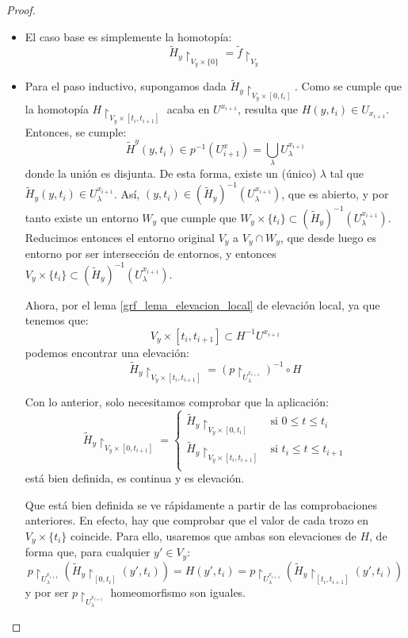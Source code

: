 \begin{lem}
\begin{proof}
		\begin{itemize}
			\item El caso base es simplemente la homotopía:
			\[\widetilde{H}_y\restriction_{V_y\times\{0\}}=\widetilde{f}\restriction_{V_y}\]
			
			\item Para el paso inductivo, supongamos dada $\widetilde{H}_y\restriction_{V_y\times [0,t_i]}$. Como se cumple que la homotopía $H\restriction_{V_y\times [t_i,t_{i+1}]}$ acaba en $U^{x_{i+1}}$, resulta que $H(y,t_i)\in U_{x_{i+1}}$. Entonces, se cumple:
			\[\widetilde{H}^y(y, t_i)\in p^{-1}(U^x_{i+1})=\bigcup_\lambda U_\lambda^{x_{i+1}}\]
			donde la unión es disjunta. De esta forma, existe un (único) $\lambda$ tal que $\widetilde{H}_y(y, t_i)\in U_\lambda^{x_{i+1}}$. Así, $(y,t_i)\in (\widetilde{H}_y)^{-1}(U_\lambda^{x_{i+1}})$, que es abierto, y por tanto existe un entorno $W_y$ que cumple que $W_y\times \{t_i\}\subset (\widetilde{H}_y)^{-1}(U_\lambda^{x_{i+1}})$. Reducimos entonces el entorno original $V_y$ a $V_y\cap W_y$, que desde luego es entorno por ser intersección de entornos, y entonces $V_y\times\{t_i\}\subset (\widetilde{H}_y)^{-1}(U_\lambda^{x_{i+1}})$.
			
			Ahora, por el lema \ref{grf_lema_elevacion_local} de elevación local, ya que tenemos que:
			\[V_y\times [t_i, t_{i+1}]\subset H^{-1} U^{x_{i+1}}\]
			podemos encontrar una elevación:
			\[\widetilde{H}_y\restriction_{V_y\times [t_i,t_{i+1}]} = (p\restriction_{U_\lambda^{x_{i+1}}})^{-1}\circ H \]
			
			Con lo anterior, solo necesitamos comprobar que la aplicación:
			\[\widetilde{H}_y\restriction_{V_y\times [0,t_{i+1}]} = \left\{\begin{array}{ll}
			\widetilde{H}_y\restriction_{V_y\times [0,t_i]} & \text{si } 0\leq t \leq t_i \\
			\widetilde{H}_y\restriction_{V_y\times [t_i,t_{i+1}]} & \text{si } t_i\leq t \leq t_{i+1} \\
			\end{array}\right.\]
			está bien definida, es continua y es elevación. 
			
			Que está bien definida se ve rápidamente a partir de las comprobaciones anteriores. En efecto, hay que comprobar que el valor de cada trozo en $V_y\times\{t_i\}$ coincide. Para ello, usaremos que ambas son elevaciones de $H$, de forma que, para cualquier $y'\in V_y$:
			\[p\restriction_{U_\lambda^{x_{i+1}}}(\widetilde{H}_y\restriction_{[0,t_i]}(y',t_i)) = H(y',t_i) = p\restriction_{U_\lambda^{x_{i+1}}}(\widetilde{H}_y\restriction_{[t_i,t_{i+1}]}(y',t_i)) \]
			y por ser $p\restriction_{U_\lambda^{x_{i+1}}}$ homeomorfismo son iguales.
			

\end{itemize}
\end{proof}
\end{lem}
